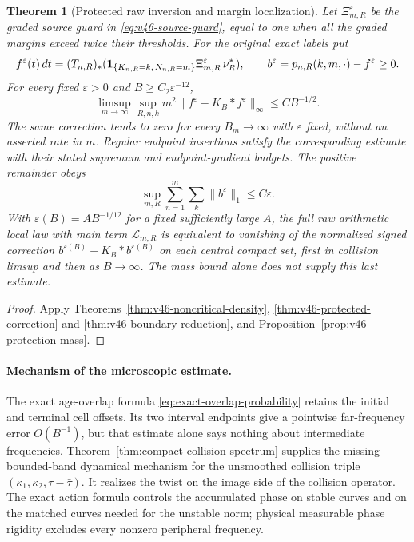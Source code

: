\documentclass[11pt,reqno]{amsart}
\numberwithin{equation}{section}
\newtheorem{leadtheorem}{Theorem}
\theoremstyle{definition}\newtheorem{definition}[theorem]{Definition}
\theoremstyle{remark}\newtheorem{remark}[theorem]{Remark}
\begin{document}
\begin{leadtheorem}[Protected raw inversion and margin localization]
\label{thm:intro-v46-protected-inverse}
Let $\Xi_{m,R}^{\varepsilon}$ be the graded source guard in
\eqref{eq:v46-source-guard}, equal to one when all the graded margins
exceed twice their thresholds. For the original exact labels put
\[
 f^\varepsilon(t)\,dt
  =(T_{n,R})_*(\mathbf1_{\{K_{n,R}=k,\,N_{n,R}=m\}}
                   \Xi_{m,R}^{\varepsilon}\,\nu_R^*),\qquad
 b^\varepsilon=p_{n,R}(k,m,\cdot)-f^\varepsilon\ge0.
\]
For every fixed $\varepsilon>0$ and $B\ge C_2\varepsilon^{-12}$,
\begin{equation}\label{eq:intro-v46-band-modulus}
 \limsup_{m\to\infty}\sup_{R,n,k}
     m^2\|f^\varepsilon-K_B*f^\varepsilon\|_\infty
                                 \le C B^{-1/2}.
\end{equation}
The same correction tends to zero for every $B_m\to\infty$ with
$\varepsilon$ fixed, without an asserted rate in $m$. Regular endpoint
insertions satisfy the corresponding estimate with their stated
supremum and endpoint-gradient budgets. The positive remainder obeys
\[
 \sup_{m,R}\sum_{n=1}^m\sum_k\|b^\varepsilon\|_1
                                    \le C\varepsilon.
\]
With $\varepsilon(B)=AB^{-1/12}$ for a fixed sufficiently large $A$,
the full raw arithmetic local law with main term $\mathcal L_{m,R}$
is equivalent to vanishing of the normalized signed correction
$b^{\varepsilon(B)}-K_B*b^{\varepsilon(B)}$ on each central compact
set, first in collision limsup and then as $B\to\infty$.
The mass bound alone does not supply this last estimate.
\end{leadtheorem}
\begin{proof}
Apply Theorems~\ref{thm:v46-noncritical-density},
\ref{thm:v46-protected-correction} and
\ref{thm:v46-boundary-reduction}, and
Proposition~\ref{prop:v46-protection-mass}.
\end{proof}

\paragraph{Mechanism of the microscopic estimate.}
The exact age-overlap formula
\eqref{eq:exact-overlap-probability} retains the initial and terminal
cell offsets. Its two interval endpoints give a pointwise far-frequency
error $O(B^{-1})$, but that estimate alone says nothing about intermediate
frequencies. Theorem~\ref{thm:compact-collision-spectrum} supplies the
missing bounded-band dynamical mechanism for the unsmoothed collision
triple $(\kappa_1,\kappa_2,\tau-\bar\tau)$. It realizes the twist on
the image side of the collision operator. The exact action formula
controls the accumulated phase on stable curves and on the matched
curves needed for the unstable norm; physical measurable phase rigidity
excludes every nonzero peripheral frequency.
\end{document}

